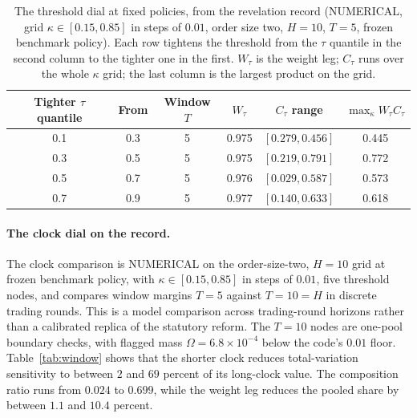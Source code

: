\documentclass[11pt]{article}
\begin{document}
\begin{table}[H]
\centering
\caption{The threshold dial at fixed policies, from the revelation record (NUMERICAL, grid
$\kappa \in [0.15, 0.85]$ in steps of $0.01$, order size two, $H=10$, $T=5$, frozen
benchmark policy). Each row
tightens the threshold from the $\tau$ quantile in the second column to the tighter one in the
first. $W_\tau$ is the weight leg; $C_\tau$ runs over the whole $\kappa$ grid; the last column
is the largest product on the grid.}
\label{tab:threshold}
\begin{tabular}{cccccc}
\toprule
Tighter $\tau$ quantile & From & Window $T$ & $W_\tau$ & $C_\tau$ range & $\max_\kappa W_\tau C_\tau$ \\
\midrule
0.1 & 0.3 & 5 & 0.975 & $[0.279, 0.456]$ & 0.445 \\
0.3 & 0.5 & 5 & 0.975 & $[0.219, 0.791]$ & 0.772 \\
0.5 & 0.7 & 5 & 0.976 & $[0.029, 0.587]$ & 0.573 \\
0.7 & 0.9 & 5 & 0.977 & $[0.140, 0.633]$ & 0.618 \\
\bottomrule
\end{tabular}
\end{table}

\paragraph{The clock dial on the record.} The clock comparison is NUMERICAL on the order-size-two,
$H=10$ grid at frozen benchmark policy, with $\kappa\in[0.15,0.85]$ in steps of $0.01$, five
threshold nodes, and compares window margins $T=5$ against $T=10=H$ in discrete trading rounds.
This is a model comparison across trading-round horizons rather than a calibrated replica of the
statutory reform. The $T=10$ nodes are one-pool boundary checks, with flagged mass
$\Omega=6.8\times10^{-4}$ below the code's $0.01$ floor. Table~\ref{tab:window} shows that the shorter clock reduces total-variation
sensitivity to between $2$ and $69$ percent of its long-clock value. The composition ratio runs
from $0.024$ to $0.699$, while the weight leg reduces the pooled share by between $1.1$ and
$10.4$ percent.
\end{document}

